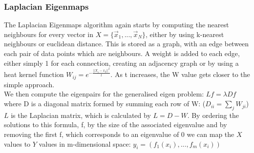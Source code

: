 \documentclass{article}
\begin{document}
\subsubsection{Laplacian Eigenmaps}
The Laplacian Eigenmaps algorithm again starts by computing the nearest neighbours for every vector in $X = \{\vec{x}_1,...,\vec{x}_N\}$, either by using k-nearest neighbours or euclidean distance. This is stored as a graph, with an edge between each pair of data points which are neighbours. A weight is added to each edge, either simply 1 for each connection, creating an adjacency graph or by using a heat kernel function $W_{ij}=e^{-\frac{||X_i-x_k||^2}{t}}$. As t increases, the W value gets closer to the simple approach.\cite{hagueeigen} \\
We then compute the eigenpairs for the generalised eigen problem: $Lf = \lambda Df$ where D is a diagonal matrix formed by summing each row of W: ($D_{ii} = \sum\limits_jW_{ji}$) $L$ is the Laplacian matrix, which is calculated by $L = D-W$. By ordering the solutions to this formula, f, by the size of the associated eigenvalue and by removing the first f, which corresponds to an eigenvalue of 0 we can map the $X$ values to $Y$ values in m-dimensional space: $y_i = (f_1(x_i),...,f_m(x_i))$
\end{document}
